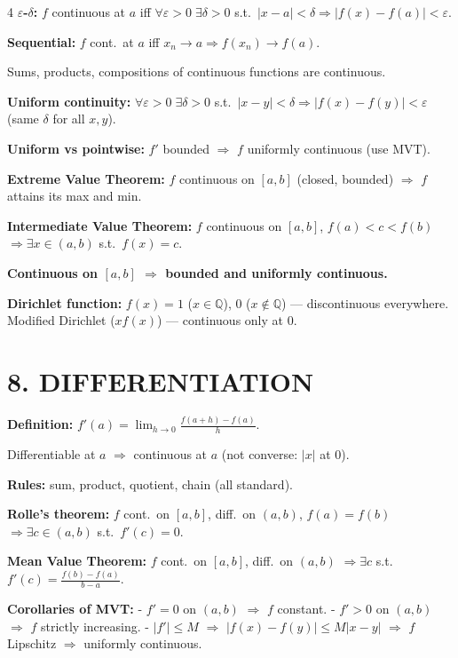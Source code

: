 \documentclass[8pt,a4paper,landscape]{extarticle}
\begin{document}
\begin{multicols}{4}
\textbf{$\varepsilon$-$\delta$:} $f$ continuous at $a$ iff $\forall\varepsilon>0\;\exists\delta>0$ s.t.\ $|x-a|<\delta\Rightarrow|f(x)-f(a)|<\varepsilon$.

\textbf{Sequential:} $f$ cont.\ at $a$ iff $x_n\to a\Rightarrow f(x_n)\to f(a)$.

Sums, products, compositions of continuous functions are continuous.

\textbf{Uniform continuity:} $\forall\varepsilon>0\;\exists\delta>0$ s.t.\ $|x-y|<\delta\Rightarrow|f(x)-f(y)|<\varepsilon$ (same $\delta$ for all $x,y$).

\textbf{Uniform vs pointwise:} $f'$ bounded $\Rightarrow$ $f$ uniformly continuous (use MVT).

\textbf{Extreme Value Theorem:} $f$ continuous on $[a,b]$ (closed, bounded) $\Rightarrow$ $f$ attains its max and min.

\textbf{Intermediate Value Theorem:} $f$ continuous on $[a,b]$, $f(a)<c<f(b)$ $\Rightarrow\exists x\in(a,b)$ s.t.\ $f(x)=c$.

\textbf{Continuous on $[a,b]$ $\Rightarrow$ bounded and uniformly continuous.}

\textbf{Dirichlet function:} $f(x)=1$ ($x\in\mathbb{Q}$), $0$ ($x\notin\mathbb{Q}$) --- discontinuous everywhere. Modified Dirichlet ($xf(x)$) --- continuous only at $0$.

\section*{8. DIFFERENTIATION}

\textbf{Definition:} $f'(a)=\lim_{h\to0}\frac{f(a+h)-f(a)}{h}$.

Differentiable at $a$ $\Rightarrow$ continuous at $a$ (not converse: $|x|$ at $0$).

\textbf{Rules:} sum, product, quotient, chain (all standard).

\textbf{Rolle's theorem:} $f$ cont.\ on $[a,b]$, diff.\ on $(a,b)$, $f(a)=f(b)$ $\Rightarrow\exists c\in(a,b)$ s.t.\ $f'(c)=0$.

\textbf{Mean Value Theorem:} $f$ cont.\ on $[a,b]$, diff.\ on $(a,b)$ $\Rightarrow\exists c$ s.t.\ $f'(c)=\frac{f(b)-f(a)}{b-a}$.

\textbf{Corollaries of MVT:}
- $f'=0$ on $(a,b)$ $\Rightarrow$ $f$ constant.
- $f'>0$ on $(a,b)$ $\Rightarrow$ $f$ strictly increasing.
- $|f'|\leq M$ $\Rightarrow$ $|f(x)-f(y)|\leq M|x-y|$ $\Rightarrow$ $f$ Lipschitz $\Rightarrow$ uniformly continuous.


\end{multicols}
\end{document}
